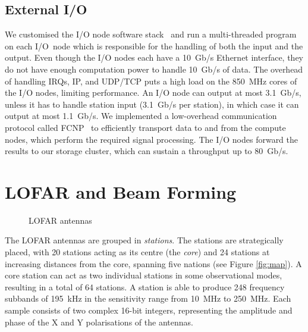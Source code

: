 \documentclass{llncs}
\begin{document}
\subsection{External I/O}
\label{Sec:Networks}

We customised the I/O node software stack~\cite{Yoshii:10} and run a multi-threaded program on each I/O~node which is responsible for the handling of both the input and the output. Even though the I/O nodes each have a 10~Gb/s Ethernet interface, they do not have enough computation power to handle 10~Gb/s of data. The overhead of handling IRQs, IP, and UDP/TCP puts a high load on the 850~MHz cores of the I/O nodes, limiting performance. An I/O node can output at most 3.1~Gb/s, unless it has to handle station input (3.1~Gb/s per station), in which case it can output at most 1.1~Gb/s. We implemented a low-overhead communication protocol called FCNP~\cite{Romein:09a} to efficiently transport data to and from the compute nodes, which perform the required signal processing. The I/O nodes forward the results to our storage cluster, which can sustain a throughput up to 80~Gb/s.

\section{LOFAR and Beam Forming}
\label{Sec:LOFAR}

\begin{figure}[t]
\hfill
{}
\hfill
{}
\caption{LOFAR antennas}
\end{figure}

The LOFAR antennas are grouped in \emph{stations}. The stations are strategically placed, with 20 stations acting as its centre (the \emph{core}) and 24 stations at increasing distances from the core, spanning five nations (see Figure \ref{fig:map}). A core station can act as two individual stations in some observational modes, resulting in a total of 64 stations. A station is able to produce 248 frequency subbands of 195~kHz in the sensitivity range from 10~MHz to 250~MHz. Each sample consists of two complex 16-bit integers, representing the amplitude and phase of the X and Y polarisations of the antennas.
\end{document}
